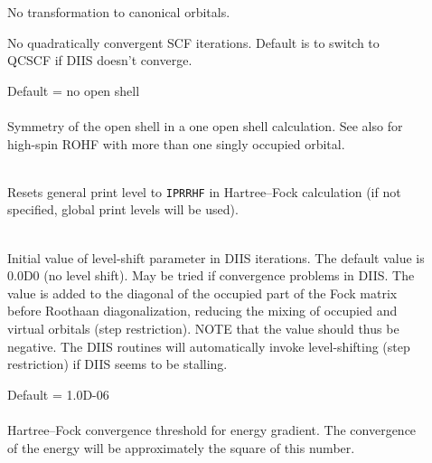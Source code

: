 \begin{description}
\item[]
  No transformation to canonical orbitals.

\item[]
  No quadratically convergent SCF iterations.
  Default is to switch to QCSCF if DIIS doesn't converge.

\item[]
  Default = no open shell\\
   \\
  Symmetry of the open shell in a one open shell
  calculation. See also  for high-spin ROHF with more than one
  singly occupied orbital.

\item[]
   \\
  Resets general print level to \verb|IPRRHF| in Hartree--Fock calculation
  (if not specified, global print levels will be used).

\item[] 
   \\
  Initial value of level-shift parameter in DIIS iterations. 
  The default value is 0.0D0 (no level shift).
  May be tried if convergence problems in DIIS. The value is added
  to the diagonal of the occupied part of the Fock matrix before
  Roothaan diagonalization, reducing the mixing of occupied and
  virtual orbitals (step restriction).
  NOTE that the value should thus be negative.  The DIIS routines
  will automatically invoke level-shifting (step restriction) if
  DIIS seems to be stalling.

\item[]
  Default = 1.0D-06\\
   \\
  Hartree--Fock convergence threshold for energy gradient.  The convergence
  of the energy will be approximately the square of this number.

\end{description}



